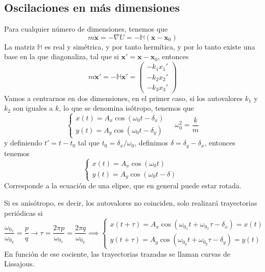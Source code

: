 \subsection{Oscilaciones en más dimensiones}
Para cualquier número de dimensiones, tenemos que
\begin{equation} \label{6.1.1}
    m\ddot{\mathbf{x}} = -\nabla U = -\mathbb{H} (\mathbf{x}-\mathbf{x}_0) 
\end{equation}
La matriz $\mathbb{H}$ es real y simétrica, y por tanto hermítica, y por lo tanto existe una base en la que diagonaliza, tal que si $\mathbf{x}' = \mathbf{x}-\mathbf{x}_0$, entonces
\begin{equation} \label{6.1.1}
    m\ddot{\mathbf{x}}' = -\mathbb{H} \mathbf{x}' = \left(\begin{matrix}
        -k_1 x_1' \\ -k_2 x_2' \\ -k_3 x_3'
    \end{matrix}\right)
\end{equation}
Vamos a centrarnos en dos dimensiones, en el primer caso, si los autovalores $k_1$ y $k_2$ son iguales a $k$, lo que se denomina isótropo, tenemos que
\begin{equation} \label{6.1.1}
    \left\{\begin{matrix}
        x(t) = A_x \cos(\omega_0t - \delta_x) \\
        y(t) = A_y \cos(\omega_0t - \delta_y) 
    \end{matrix}\right. \ \ \ \ \ \omega_0^2 = \frac{k}{m}
\end{equation}
y definiendo $t' = t-t_0$ tal que $t_0 = \delta_x/\omega_0$, definimos $\delta = \delta_y-\delta_x$, entonces tenemos
\begin{equation} \label{6.1.1}
    \left\{\begin{matrix}
        x(t) = A_x \cos(\omega_0t) \phantom{--}\\
        y(t) = A_y \cos(\omega_0t - \delta) 
    \end{matrix}\right.
\end{equation}
Corresponde a la ecuación de una elipse, que en general puede estar rotada.

Si es anisótropo, es decir, los autovalores no coinciden, solo realizará trayectorias periódicas si 
\begin{equation} \label{6.1.1}
    \frac{\omega_0_x}{\omega_0_y} = \frac{p}{q} \rightarrow \tau = \frac{2\pi p}{\omega_0_x} = \frac{2\pi q}{\omega_0_y} \implies \left\{\begin{matrix}
        x(t+\tau) = A_x \cos(\omega_0_xt + \omega_0_x \tau -\delta_x) = x(t) \\
        y(t+\tau) = A_y \cos(\omega_0_yt +\omega_0_y \tau- \delta_y) = y(t)
    \end{matrix}\right.
\end{equation}
En función de ese cociente, las trayectorias trazadas se llaman curvas de Lissajous.
\newpage
